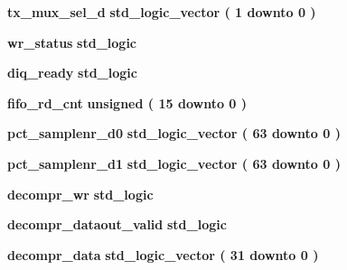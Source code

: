 \begin{DoxyCompactItemize}
\item 
{\bf tx\+\_\+mux\+\_\+sel\+\_\+d} {\bfseries \textcolor{comment}{std\+\_\+logic\+\_\+vector}\textcolor{vhdlchar}{ }\textcolor{vhdlchar}{(}\textcolor{vhdlchar}{ }\textcolor{vhdlchar}{ } \textcolor{vhdldigit}{1} \textcolor{vhdlchar}{ }\textcolor{keywordflow}{downto}\textcolor{vhdlchar}{ }\textcolor{vhdlchar}{ } \textcolor{vhdldigit}{0} \textcolor{vhdlchar}{ }\textcolor{vhdlchar}{)}\textcolor{vhdlchar}{ }} 
\item 
{\bf wr\+\_\+status} {\bfseries \textcolor{comment}{std\+\_\+logic}\textcolor{vhdlchar}{ }} 
\item 
{\bf diq\+\_\+ready} {\bfseries \textcolor{comment}{std\+\_\+logic}\textcolor{vhdlchar}{ }} 
\item 
{\bf fifo\+\_\+rd\+\_\+cnt} {\bfseries \textcolor{comment}{unsigned}\textcolor{vhdlchar}{ }\textcolor{vhdlchar}{(}\textcolor{vhdlchar}{ }\textcolor{vhdlchar}{ } \textcolor{vhdldigit}{15} \textcolor{vhdlchar}{ }\textcolor{keywordflow}{downto}\textcolor{vhdlchar}{ }\textcolor{vhdlchar}{ } \textcolor{vhdldigit}{0} \textcolor{vhdlchar}{ }\textcolor{vhdlchar}{)}\textcolor{vhdlchar}{ }} 
\item 
{\bf pct\+\_\+samplenr\+\_\+d0} {\bfseries \textcolor{comment}{std\+\_\+logic\+\_\+vector}\textcolor{vhdlchar}{ }\textcolor{vhdlchar}{(}\textcolor{vhdlchar}{ }\textcolor{vhdlchar}{ } \textcolor{vhdldigit}{63} \textcolor{vhdlchar}{ }\textcolor{keywordflow}{downto}\textcolor{vhdlchar}{ }\textcolor{vhdlchar}{ } \textcolor{vhdldigit}{0} \textcolor{vhdlchar}{ }\textcolor{vhdlchar}{)}\textcolor{vhdlchar}{ }} 
\item 
{\bf pct\+\_\+samplenr\+\_\+d1} {\bfseries \textcolor{comment}{std\+\_\+logic\+\_\+vector}\textcolor{vhdlchar}{ }\textcolor{vhdlchar}{(}\textcolor{vhdlchar}{ }\textcolor{vhdlchar}{ } \textcolor{vhdldigit}{63} \textcolor{vhdlchar}{ }\textcolor{keywordflow}{downto}\textcolor{vhdlchar}{ }\textcolor{vhdlchar}{ } \textcolor{vhdldigit}{0} \textcolor{vhdlchar}{ }\textcolor{vhdlchar}{)}\textcolor{vhdlchar}{ }} 
\item 
{\bf decompr\+\_\+wr} {\bfseries \textcolor{comment}{std\+\_\+logic}\textcolor{vhdlchar}{ }} 
\item 
{\bf decompr\+\_\+dataout\+\_\+valid} {\bfseries \textcolor{comment}{std\+\_\+logic}\textcolor{vhdlchar}{ }} 
\item 
{\bf decompr\+\_\+data} {\bfseries \textcolor{comment}{std\+\_\+logic\+\_\+vector}\textcolor{vhdlchar}{ }\textcolor{vhdlchar}{(}\textcolor{vhdlchar}{ }\textcolor{vhdlchar}{ } \textcolor{vhdldigit}{31} \textcolor{vhdlchar}{ }\textcolor{keywordflow}{downto}\textcolor{vhdlchar}{ }\textcolor{vhdlchar}{ } \textcolor{vhdldigit}{0} \textcolor{vhdlchar}{ }\textcolor{vhdlchar}{)}\textcolor{vhdlchar}{ }} 

\end{DoxyCompactItemize}
